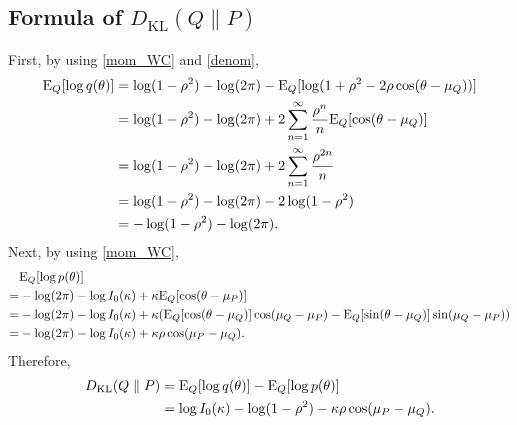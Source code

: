 \documentclass[11pt, a4paper]{article}
\begin{document}
\subsection{Formula of $D_{\text{KL}}(Q \parallel P)$}
First, by using \eqref{mom_WC} and \eqref{denom},
\begin{align*}
	{\rm E}_Q[\log q(\theta)] &= \log(1 - \rho^2) - \log(2\pi) - {\rm E}_Q[\log(1 + \rho^2 - 2\rho\cos(\theta - \mu_Q))] \\
	&= \log(1 - \rho^2) - \log(2\pi) + 2 \sum_{n=1}^\infty \frac{\rho^{n}}{n} 
	{\rm E}_Q [\cos(\theta - \mu_Q)] \\
	&= \log(1 - \rho^2) - \log(2\pi) + 2 \sum_{n=1}^\infty \frac{\rho^{2n}}{n}  \\
	&= \log(1 - \rho^2) - \log(2\pi) - 2 \log (1-\rho^2)  \\
	& = -\log(1 - \rho^2) - \log(2\pi).
\end{align*}
Next, by using \eqref{mom_WC},
\begin{align*}
	&{\rm E}_Q[\log p(\theta)] \\
	=& -\log(2\pi) - \log I_0(\kappa) + \kappa {\rm E}_Q[\cos(\theta - \mu_P)] \\
	=& -\log(2\pi) - \log I_0(\kappa) + \kappa ({\rm E}_Q[\cos(\theta - \mu_Q)] \cos(\mu_Q-\mu_P)-{\rm E}_Q[\sin(\theta - \mu_Q)] \sin(\mu_Q-\mu_P)) \\
	=& -\log(2\pi) - \log I_0(\kappa) + \kappa \rho \cos(\mu_P-\mu_Q).
\end{align*}
Therefore,
\begin{align*}
	D_{\text{KL}}(Q \parallel P) &= {\rm E}_Q[\log q(\theta)] - {\rm E}_Q[\log p(\theta)] \\
	&= \log I_0(\kappa) - \log(1 - \rho^2) - \kappa \rho \cos(\mu_P - \mu_Q).
\end{align*}
\end{document}
